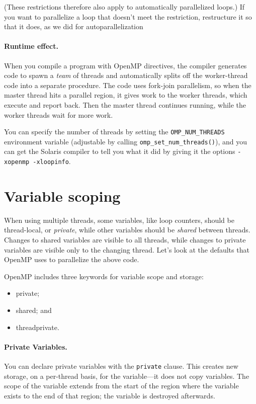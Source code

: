 \documentclass[a4paper]{report}
\begin{document}
(These restrictions therefore also apply to automatically parallelized
loops.) If you want to parallelize a loop that doesn't meet the 
restriction, restructure it so that it does, as we  did for autoparallelization

\paragraph{Runtime effect.} When you compile a program with 
OpenMP directives, the compiler generates code to spawn a \emph{team}
of threads and automatically splits off the worker-thread code into a
separate procedure. The code uses fork-join parallelism, so when the
master thread hits a parallel region, it gives work to the worker
threads, which execute and report back. Then the master thread
continues running, while the worker threads wait for more work.

You can specify the number of threads by setting the
\verb+OMP_NUM_THREADS+ environment variable (adjustable by calling 
\verb+omp_set_num_threads()+), and you can get the
Solaris compiler to tell you what it did by giving it the
options \verb+-xopenmp -xloopinfo+.

\section*{Variable scoping}
When using multiple threads, some variables, like loop counters,
should be thread-local, or \emph{private}, while other variables
should be \emph{shared} between threads. Changes to shared variables
are visible to all threads, while changes to private variables are
visible only to the changing thread. Let's look at the defaults that
OpenMP uses to parallelize the above code.


OpenMP includes three keywords for variable scope and storage:
\begin{itemize}
        \item private;
        \item shared; and
        \item threadprivate.
\end{itemize}

\paragraph{Private Variables.} You can declare private variables
with the {\tt private} clause. This creates new storage, on a per-thread
basis, for the variable---it does not copy variables. The scope
of the variable extends from the start of the region where the variable
exists to the end of that region; the variable is destroyed afterwards.
\end{document}
